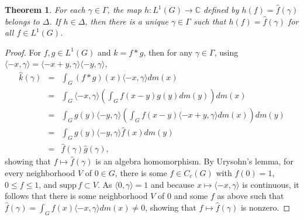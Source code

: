 \documentclass{article}
\newcommand{\inner}[2]{\langle #1, #2 \rangle}
\newcommand{\supp}{\mathrm{supp}\,}
\newtheorem{theorem}{Theorem}
\begin{document}
\begin{theorem}
For each $\gamma \in \Gamma$, the map 
$h:L^1(G) \to \mathbb{C}$ defined by
$h(f) =  \hat{f}(\gamma)$ belongs to $\Delta$. If $h \in \Delta$, then there is 
a unique $\gamma \in \Gamma$ such that $h(f)=\hat{f}(\gamma)$ for all $f \in L^1(G)$.
\label{maxideal}
\end{theorem}
\begin{proof}
For $f,g \in L^1(G)$ and $k=f*g$, then for any $\gamma \in \Gamma$, using $\inner{-x}{\gamma}=
\inner{-x+y}{\gamma} \inner{-y}{\gamma}$,
\begin{eqnarray*}
\hat{k}(\gamma)&=&\int_G (f*g)(x) \inner{-x}{\gamma} dm(x)\\
&=&\int_G \inner{-x}{\gamma} \left( \int_G f(x-y) g(y) dm(y) \right) dm(x)\\
&=&\int_G g(y) \inner{-y}{\gamma} \left(\int_G f(x-y) \inner{-x+y}{\gamma} dm(x) \right) dm(y)\\
&=&\int_G g(y) \inner{-y}{\gamma} \hat{f}(x) dm(y)\\
&=&\hat{f}(\gamma) \hat{g}(\gamma),
\end{eqnarray*}
showing that $f \mapsto \hat{f}(\gamma)$ is an algebra homomorphism. By Urysohn's lemma, for every  neighborhood
$V$ of $0 \in G$, there is some $f \in C_c(G)$ with $f(0)=1$, $0 \leq f \leq 1$, and $\supp f \subset V$. 
As $\inner{0}{\gamma}=1$ and because $x \mapsto \inner{-x}{\gamma}$ is continuous, it follows that there is some neighborhood $V$ of $0$ and some $f$ as above such that
$\hat{f}(\gamma) = \int_G f(x) \inner{-x}{\gamma} dm(x) \neq 0$, showing that $f \mapsto \hat{f}(\gamma)$ is nonzero. 


\end{proof}
\end{document}
